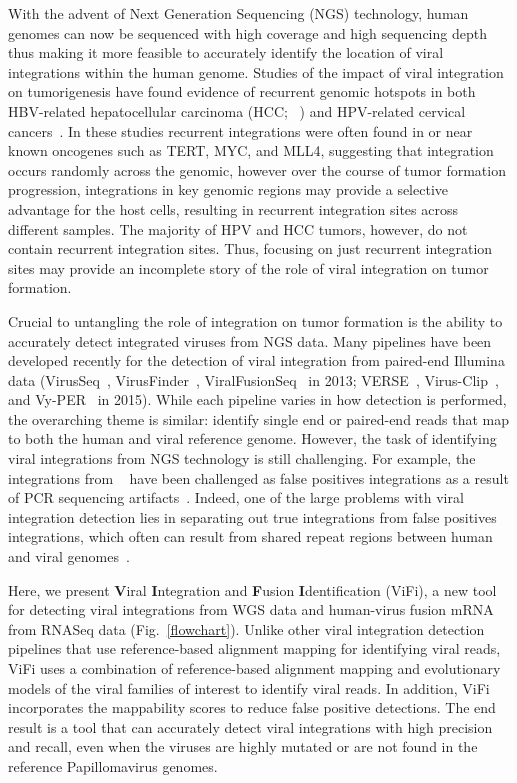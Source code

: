 \documentclass[11pt]{article}
\begin{document}
With the advent of Next Generation Sequencing (NGS) technology, human genomes can now be sequenced with high coverage and high sequencing depth thus making it more feasible to accurately identify the location of viral integrations within the human genome.  Studies of the impact of viral integration on tumorigenesis have found evidence of recurrent genomic hotspots in both HBV-related hepatocellular carcinoma (HCC; ~\cite{Ding2012, Khoury2013}) and HPV-related cervical cancers~\cite{Schmitz2012}.  In these studies recurrent integrations were often found in or near known oncogenes such as TERT, MYC, and MLL4, suggesting that integration occurs randomly across the genomic, however over the course of tumor formation progression, integrations in key genomic regions may provide a selective advantage for the host cells, resulting in recurrent integration sites across different samples.  The majority of HPV and HCC tumors, however, do not contain recurrent integration sites.  Thus, focusing on just recurrent integration sites may provide an incomplete story of the role of viral integration on tumor formation.  

Crucial to untangling the role of integration on tumor formation is the ability to accurately detect integrated viruses from NGS data.  Many pipelines have been developed recently for the detection of viral integration from paired-end Illumina data (VirusSeq~\cite{Chen2013}, VirusFinder~\cite{Wang2013}, ViralFusionSeq~\cite{Li2013} in 2013; VERSE~\cite{Wang2015}, Virus-Clip~\cite{Ho2015}, and Vy-PER~\cite{Forster2015} in 2015).  While each pipeline varies in how detection is performed, the overarching theme is similar: identify single end or paired-end reads that map to both the human and viral reference genome.  However, the task of identifying viral integrations from NGS technology is still challenging.  For example, the integrations from ~\cite{Hu2015} have been challenged as false positives integrations as a result of PCR sequencing artifacts~\cite{Dyer2015}.  Indeed, one of the large problems with viral integration detection lies in separating out true integrations from false positives integrations, which often can result from shared repeat regions between human and viral genomes~\cite{Forster2015}.  

Here, we present \textbf{V}iral \textbf{I}ntegration and \textbf{F}usion \textbf{I}dentification (ViFi), a new tool for detecting viral integrations from WGS data and human-virus fusion mRNA from RNASeq data (Fig.~\ref{flowchart}).  Unlike other viral integration detection pipelines that use reference-based alignment mapping for identifying viral reads, ViFi uses a combination of reference-based alignment mapping and evolutionary models of the viral families of interest to identify viral reads.  In addition, ViFi incorporates the mappability scores to reduce false positive detections.  The end result is a tool that can accurately detect viral integrations with high precision and recall, even when the viruses are highly mutated or are not found in the reference Papillomavirus genomes.  
\end{document}
